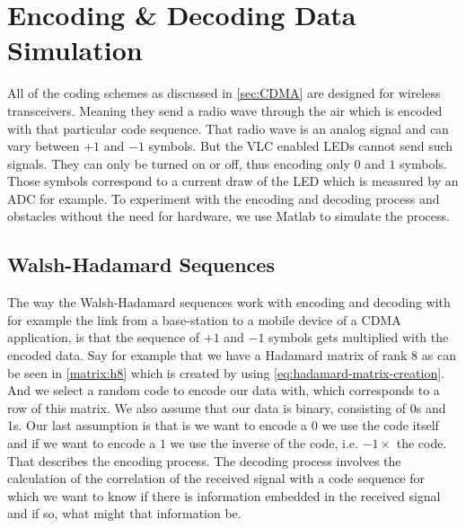 
\section{Encoding \& Decoding Data Simulation}
\label{sec:enc-dec-theory}

	All of the coding schemes as discussed in \autoref{sec:CDMA} are designed for wireless transceivers.
	Meaning they send a radio wave through the air which is encoded with that particular code sequence.
	That radio wave is an analog signal and can vary between $+1$ and $-1$ symbols.
	But the VLC enabled LEDs cannot send such signals.
	They can only be turned on or off, thus encoding only $0$ and $1$ symbols.
	Those symbols correspond to a current draw of the LED which is measured by an ADC for example.
	To experiment with the encoding and decoding process and obstacles without the need for hardware, we use Matlab to simulate the process.

	\subsection{Walsh-Hadamard Sequences}

		The way the Walsh-Hadamard sequences work with encoding and decoding with for example the link from a base-station to a mobile device of a CDMA application, is that the sequence of $+1$ and $-1$ symbols gets multiplied with the encoded data. 
		Say for example that we have a Hadamard matrix of rank $8$ as can be seen in \autoref{matrix:h8} which is created by using \autoref{eq:hadamard-matrix-creation}.
		And we select a random code to encode our data with, which corresponds to a row of this matrix.
		We also assume that our data is binary, consisting of 0s and 1s. 
		Our last assumption is that is we want to encode a $0$ we use the code itself and if we want to encode a $1$ we use the inverse of the code, i.e. $-1 \times$ the code.
		That describes the encoding process. 
		The decoding process involves the calculation of the correlation of the received signal with a code sequence for which we want to know if there is information embedded in the received signal and if so, what might that information be.

